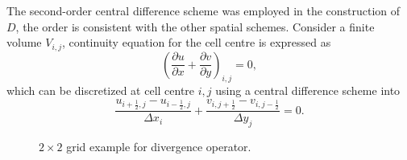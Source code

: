 \documentclass{article}
\begin{document}
The second-order central difference scheme was employed in the construction of $D$, the order is consistent with the other spatial schemes. Consider a finite volume $V_{i,j}$, continuity equation for the cell centre is expressed as
\begin{equation*}
	\left(\frac{\partial u}{\partial x} + \frac{\partial v}{\partial y}\right)_{i,j}=0,
\end{equation*}
which can be discretized at cell centre $i,j$ using a central difference scheme into
\begin{equation*}
  \frac{u_{i+\frac{1}{2},j} - u_{i-\frac{1}{2},j}}{\Delta x_i}+  \frac{v_{i,j+\frac{1}{2}} - v_{i,j-\frac{1}{2}}}{\Delta y_j}=0.
\end{equation*}

\begin{figure}[H] %
  \caption{$2\times 2$ grid example for divergence operator.}\label{fig:D-example-2x2}
\end{figure}
\end{document}
